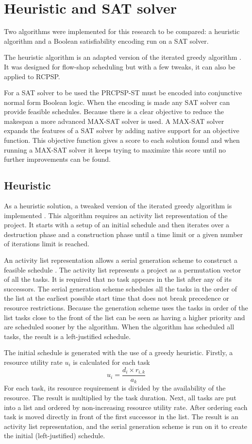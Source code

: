 \section{Heuristic and SAT solver}
Two algorithms were implemented for this research to be compared: a heuristic algorithm and a Boolean satisfiability encoding run on a SAT solver.

The heuristic algorithm is an adapted version of the iterated greedy algorithm \cite{RN32}. It was designed for flow-shop scheduling but with a few tweaks, it can also be applied to RCPSP.

For a SAT solver to be used the PRCPSP-ST must be encoded into conjunctive normal form Boolean logic. When the encoding is made any SAT solver can provide feasible schedules. Because there is a clear objective to reduce the makespan a more advanced MAX-SAT solver is used. A MAX-SAT solver expands the features of a SAT solver by adding native support for an objective function. This objective function gives a score to each solution found and when running a MAX-SAT solver it keeps trying to maximize this score until no further improvements can be found.

\subsection{Heuristic}
As a heuristic solution, a tweaked version of the iterated greedy algorithm is implemented \cite{RN32}. This algorithm requires an activity list representation of the project. It starts with a setup of an initial schedule and then iterates over a destruction phase and a construction phase until a time limit or a given number of iterations limit is reached. 

An activity list representation allows a serial generation scheme to construct a feasible schedule \cite{RN46}. The activity list represents a project as a permutation vector of all the tasks. It is required that no task appears in the list after any of its successors. The serial generation scheme schedules all the tasks in the order of the list at the earliest possible start time that does not break precedence or resource restrictions. Because the generation scheme uses the tasks in order of the list tasks close to the front of the list can be seen as having a higher priority and are scheduled sooner by the algorithm. When the algorithm has scheduled all tasks, the result is a left-justified schedule.

The initial schedule is generated with the use of a greedy heuristic. Firstly, a resource utility rate \(u_i\) is calculated for each task 
\begin{equation}
u_i=\frac{d_i \times r_{i,k}}{a_k} 
\end{equation}
For each task, its resource requirement is divided by the availability of the resource. The result is multiplied by the task duration. Next, all tasks are put into a list and ordered by non-increasing resource utility rate. After ordering each task is moved directly in front of the first successor in the list. The result is an activity list representation, and the serial generation scheme is run on it to create the initial (left-justified) schedule.


